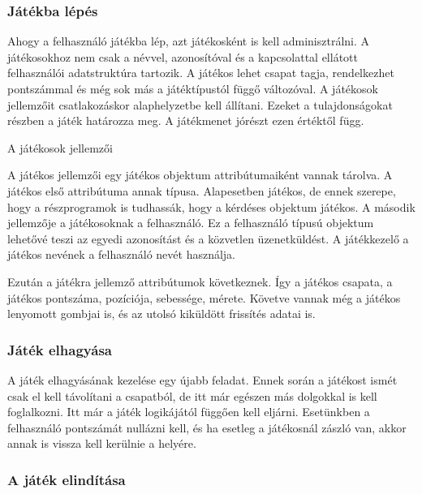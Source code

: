 \documentclass[]{article}
\begin{document}
\hypertarget{juxe1tuxe9kba-luxe9puxe9s}{%
\subsubsection{Játékba lépés}\label{juxe1tuxe9kba-luxe9puxe9s}}

Ahogy a felhasználó játékba lép, azt játékosként is kell adminisztrálni.
A játékosokhoz nem csak a névvel, azonosítóval és a kapcsolattal
ellátott felhasználói adatstruktúra tartozik. A játékos lehet csapat
tagja, rendelkezhet pontszámmal és még sok más a játéktípustól függő
változóval. A játékosok jellemzőit csatlakozáskor alaphelyzetbe kell
állítani. Ezeket a tulajdonságokat részben a játék határozza meg. A
játékmenet jórészt ezen értéktől függ.

A játékosok jellemzői

A játékos jellemzői egy játékos objektum attribútumaiként vannak
tárolva. A játékos első attribútuma annak típusa. Alapesetben játékos,
de ennek szerepe, hogy a részprogramok is tudhassák, hogy a kérdéses
objektum játékos. A második jellemzője a játékosoknak a felhasználó. Ez
a felhasználó típusú objektum lehetővé teszi az egyedi azonosítást és a
közvetlen üzenetküldést. A játékkezelő a játékos nevének a felhasználó
nevét használja.

Ezután a játékra jellemző attribútumok következnek. Így a játékos
csapata, a játékos pontszáma, pozíciója, sebessége, mérete. Követve
vannak még a játékos lenyomott gombjai is, és az utolsó kiküldött
frissítés adatai is.

\hypertarget{juxe1tuxe9k-elhagyuxe1sa}{%
\subsubsection{Játék elhagyása}\label{juxe1tuxe9k-elhagyuxe1sa}}

A játék elhagyásának kezelése egy újabb feladat. Ennek során a játékost
ismét csak el kell távolítani a csapatból, de itt már egészen más
dolgokkal is kell foglalkozni. Itt már a játék logikájától függően kell
eljárni. Esetünkben a felhasználó pontszámát nullázni kell, és ha
esetleg a játékosnál zászló van, akkor annak is vissza kell kerülnie a
helyére.

\hypertarget{a-juxe1tuxe9k-elinduxedtuxe1sa}{%
\subsubsection{A játék
elindítása}\label{a-juxe1tuxe9k-elinduxedtuxe1sa}}
\end{document}

